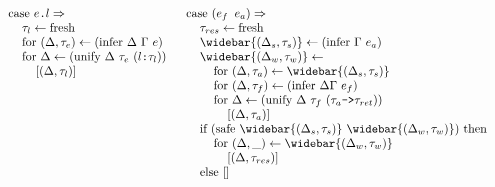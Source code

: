 \documentclass[acmsmall]{acmart}
\begin{document}
\begin{figure*}[h]
\[\begin{array}[t]{@{} l}
    \\
    \I \text{case } \code{$e$.$l$} \Rightarrow  
    \\
    \I\I \tau_l \leftarrow \text{fresh}
    \\
    \I\I \text{for } (\Delta, \tau_e) \leftarrow (\text{infer } \Delta\ \Gamma\ e)
    \\
    \I\I \text{for } \Delta \leftarrow (\text{unify } \Delta\ \tau_e\ (\code{$l$:$\tau_l$}))
    \\
    \I\I\I [(\Delta, \tau_l)]
\end{array}
\begin{array}[t]{@{} l}
    \\
    \I \text{case } (\code{$e_f$ $e_a$}) \Rightarrow  
    \\
    \I\I \tau_{res} \leftarrow \text{fresh}
    \\
    \I\I \widebar{(\Delta_s, \tau_s)} \leftarrow (\text{infer } \Gamma\ e_a)
    \\
    \I\I \widebar{(\Delta_w, \tau_w)} \leftarrow
    \\
    \I\I\I \text{for } (\Delta, \tau_a) \leftarrow \widebar{(\Delta_s, \tau_s)}
    \\
    \I\I\I \text{for } (\Delta, \tau_f) \leftarrow (\text{infer } \Delta \Gamma\ e_f)
    \\
    \I\I\I \text{for } \Delta \leftarrow (\text{unify } \Delta\ \tau_f\ (\code{$\tau_a$->$\tau_{ret}$}))
    \\
    \I\I\I\I [(\Delta, \tau_a)]
    \\
    \I\I \text{if } (\text{safe } \widebar{(\Delta_s, \tau_s)}\ \widebar{(\Delta_w, \tau_w)} ) \text{ then }
    \\
    \I\I\I \text{for } (\Delta, \_) \leftarrow \widebar{(\Delta_w, \tau_w)}
    \\
    \I\I\I\I [(\Delta, \tau_{res})]
    \\
    \I\I \text{else } [] 
\end{array}
\]





\end{figure*}
\end{document}
